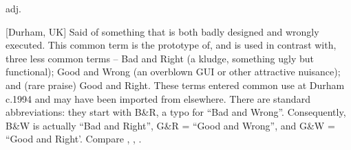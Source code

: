  adj.

[Durham, UK] Said of something that is both badly designed and wrongly executed.
This common term is the prototype of, and is used in contrast with, three less
common terms -- Bad and Right (a kludge, something ugly but functional); Good
and Wrong (an overblown GUI or other attractive nuisance); and (rare praise)
Good and Right. These terms entered common use at Durham c.1994 and may have
been imported from elsewhere. There are standard abbreviations: they start with
B\&R, a typo for ``Bad and Wrong''. Consequently, B\&W is actually ``Bad and
Right'', G\&R = ``Good and Wrong'', and G\&W = ``Good and Right'. Compare
, , .


